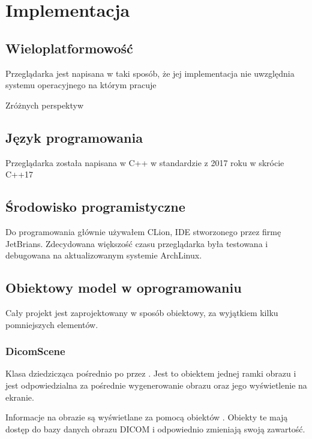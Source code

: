 \section{Implementacja}

\subsection{Wieloplatformowość}

Przeglądarka jest napisana w taki sposób, że jej implementacja nie uwzględnia systemu operacyjnego na którym pracuje

Zróżnych perspektyw

\subsection{Język programowania}

Przeglądarka została napisana w C++ w standardzie z 2017 roku w skrócie C++17

\subsection{Środowisko programistyczne}

Do programowania głównie używałem CLion, IDE stworzonego przez firmę JetBrians.
Zdecydowana większość czasu przeglądarka była testowana i debugowana na aktualizowanym systemie ArchLinux.

\subsection{Obiektowy model w oprogramowaniu}

Cały projekt jest zaprojektowany w sposób obiektowy, za wyjątkiem kilku pomniejszych elementów.

\subsubsection{DicomScene}

Klasa dziedzicząca pośrednio po  przez .
Jest to obiektem jednej ramki obrazu i jest odpowiedzialna za pośrednie wygenerowanie obrazu oraz jego wyświetlenie na ekranie.

Informacje na obrazie są wyświetlane za pomocą obiektów .
Obiekty te mają dostęp do bazy danych obrazu DICOM i odpowiednio zmieniają swoją zawartość.


